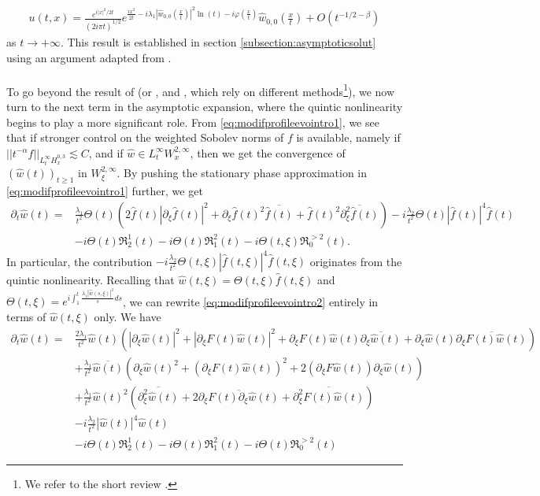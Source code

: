 \documentclass[a4paper, 15pt]{article}
\numberwithin{equation}{section}
\begin{document}
  \begin{align}
u(t,x)=\frac{e^{i|x|^2/2t}}{(2i\pi t)^{1/2}}e^{\frac{ix^2}{2t}-i\lambda_1|\hat{w}_{0,0}\left(\frac{x}{t}\right)|^2\ln(t)-i\varphi(\frac{x}{
t})}\hat{w}_{0,0}\left(\frac{x}{t}\right)+O(t^{-1/2-\beta})
\end{align}
as $t\to+\infty$. This result is established in section \ref{subsection:asymptoticsolut} using an argument adapted from \cite{zbMATH01192427}. \\\\
To go beyond the result of \cite{zbMATH06033880} (or \cite{zbMATH01192427}, \cite{zbMATH05036894} and \cite{zbMATH06502053}, which rely on different methods\footnote{We refer to the short review \cite{zbMATH07623540}.}), we now turn to the next term in the asymptotic expansion, where the quintic nonlinearity begins to play a more significant role. From \eqref{eq:modifprofileevointro1}, we see that if stronger control on the weighted Sobolev norms of $f$ is available, namely if $||t^{-\alpha}f||_{L^\infty_t H^{0,3}_x}\lesssim C$, and if $\hat{w}\in L^\infty_t W^{2,\infty}_x$, then we get the convergence of  $(\hat{w}(t))_{t\geq1}$ in $W^{2,\infty}_\xi$. By pushing the stationary phase approximation in \eqref{eq:modifprofileevointro1} further, we get 
\begin{align}
\label{eq:modifprofileevointro2}
    \partial_t\hat{w}(t)=&\frac{\lambda_1}{t^2}\Theta(t)\left(2\hat{f}(t)|\partial_\xi\hat{f}(t)|^2+\partial_\xi\hat{f}(t)^2\overline{\hat{f}(t)}+\hat{f}(t)^2\overline{\partial_\xi^2\hat{f}(t)}\right)-i\frac{\lambda_2}{t^2}\Theta(t)|\hat{f}(t)|^4\hat{f}(t)\\
   \nonumber &-i\Theta(t)\mathfrak{R}^1_2(t)-i\Theta(t)\mathfrak{R}^2_1(t)-i\Theta(t,\xi)\mathfrak{R}^{>2}_0(t).
\end{align}
In particular, the contribution $-i\frac{\lambda_2}{t^2}\Theta(t,\xi)|\hat{f}(t,\xi)|^4\hat{f}(t,\xi)$ originates from the quintic nonlinearity. Recalling that $\hat{w}(t,\xi)=\Theta(t,\xi)\hat{f}(t,\xi)$ and $\Theta(t,\xi)=e^{i\int^t_1\frac{\lambda_1|\hat{w}(s,\xi)|^2}{s}ds}$, we can rewrite \eqref{eq:modifprofileevointro2} entirely in terms of $\hat{w}(t,\xi)$ only. We have 
 \begin{align}
\label{eq:modifprofileevointro3}
    \partial_t\hat{w}(t)=&\frac{2\lambda_1}{t^2}\hat{w}(t)(|\partial_\xi\hat{w}(t)|^2+|\partial_\xi F(t)\hat{w}(t)|^2+\partial_\xi F(t)\hat{w}(t)\overline{\partial_\xi\hat{w}(t)}+\partial_\xi\hat{w}(t)\overline{\partial_\xi F(t)\hat{w}(t)})\\
   \nonumber &+\frac{\lambda_1}{t^2}\overline{\hat{w}(t)}(\partial_\xi\hat{w}(t)^2+(\partial_\xi F(t)\hat{w}(t))^2+2(\partial_\xi F\hat{w}(t))\partial_\xi\hat{w}(t))\\
   \nonumber&+\frac{\lambda_1}{t^2}\hat{w}(t)^2(\overline{\partial_\xi^2\hat{w}(t)}+2\overline{\partial_\xi F(t)\partial_\xi\hat{w}(t)}+\overline{\partial^2_\xi F(t)\hat{w}(t)})\\
  \nonumber &-i\frac{\lambda_2}{t^2}|\hat{w}(t)|^4\hat{w}(t)\\
   \nonumber &-i\Theta(t)\mathfrak{R}^1_2(t)-i\Theta(t)\mathfrak{R}^2_1(t)-i\Theta(t)\mathfrak{R}^{>2}_0(t)
\end{align}
\end{document}
